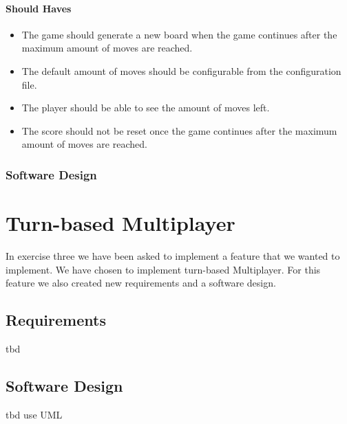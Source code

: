 \documentclass{article}
\begin{document}
\paragraph{Should Haves}
\begin{itemize}
	\item The game should generate a new board when the game continues after the maximum amount of moves are reached.
	\item The default amount of moves should be configurable from the configuration file.
	\item The player should be able to see the amount of moves left.
	\item The score should not be reset once the game continues after the maximum amount of moves are reached.
\end{itemize}


\subsubsection{Software Design}


\section{Turn-based Multiplayer}
In exercise three we have been asked to implement a feature that we wanted to implement. We have chosen to implement turn-based Multiplayer. For this feature we also created new requirements and a software design.

\subsection{Requirements}
tbd

\subsection{Software Design}
tbd {use UML}
\end{document}
